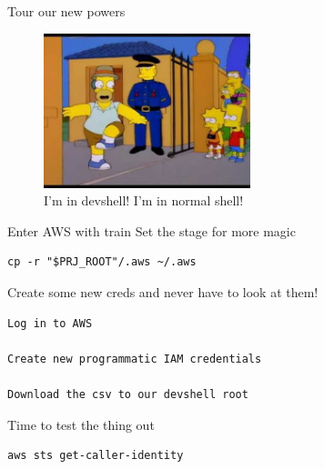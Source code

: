 \documentclass[bigger]{beamer}
\begin{document}
\begin{frame}[label={sec:orgb2d34a4}]{Tour our new powers}
\begin{figure}[htbp]
\centering
\includegraphics[width=6cm]{homer.jpg}
\caption{I'm in devshell! I'm in normal shell!}
\end{figure}
\end{frame}
\begin{frame}[label={sec:orgda50dd8},fragile]{Enter AWS with train}
 Set the stage for more magic
\begin{verbatim}
cp -r "$PRJ_ROOT"/.aws ~/.aws
\end{verbatim}
Create some new creds and never have to look at them!
\begin{verbatim}
Log in to AWS

Create new programmatic IAM credentials

Download the csv to our devshell root
\end{verbatim}
\end{frame}
\begin{frame}[label={sec:orgec9a1fe},fragile]{Time to test the thing out}
 \begin{verbatim}
aws sts get-caller-identity
\end{verbatim}
\end{frame}
\end{document}
